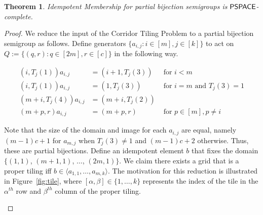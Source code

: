\documentclass{amsart}
\newcommand{\PSPACE}{\ensuremath\mathsf{PSPACE}}
\newtheorem{theorem}{Theorem}[section]
\theoremstyle{remark}
\numberwithin{equation}{section}
\begin{document}
\begin{theorem} \label{idmemthm}
  Idempotent Membership for partial bijection semigroups is $\PSPACE$-complete.
\end{theorem}
\begin{proof}
We reduce the input of the Corridor Tiling Problem to a partial bijection semigroup as follows. Define generators $\{a_{i,j}:i \in [m],j \in [k]\}$ to act on $Q:= \{(q,r):q \in [2m], r \in [c]\}$ in the following way.

\begin{align*}
(i,T_j(1))a_{i,j} &= (i+1,T_j(3)) &\text{ for } i < m \\
(i,T_j(1))a_{i,j} &= (1,T_j(3)) &\text{ for } i = m \text{ and } T_j(3) = 1\\
(m+i,T_j(4))a_{i,j} &= (m+i,T_j(2)) \\
(m+p,r)a_{i,j} &= (m+p,r) &\text{ for } p \in [m], p \neq i
\end{align*}

Note that the size of the domain and image for each $a_{i,j}$ are equal, namely $(m-1)c+1$ for $a_{m,j}$ when $T_j(3) \neq 1$ and $(m-1)c+2$ otherwise. Thus, these are partial bijections. Define an idempotent element $b$ that fixes the domain $\{(1,1)$, $(m+1,1)$, $\dots$, $(2m,1)\}$. We claim there exists a grid that is a proper tiling iff $b \in \langle a_{1,1}, \dots, a_{m,k} \rangle$. The motivation for this reduction is illustrated in Figure~\ref{fig:tile}, where $[\alpha,\beta] \in \{1,\dots,k\}$ represents the index of the tile in the $\alpha^{th}$ row and $\beta^{th}$ column of the proper tiling.

\begin{figure}
\centering
{}
\end{figure}
\end{proof}
\end{document}
